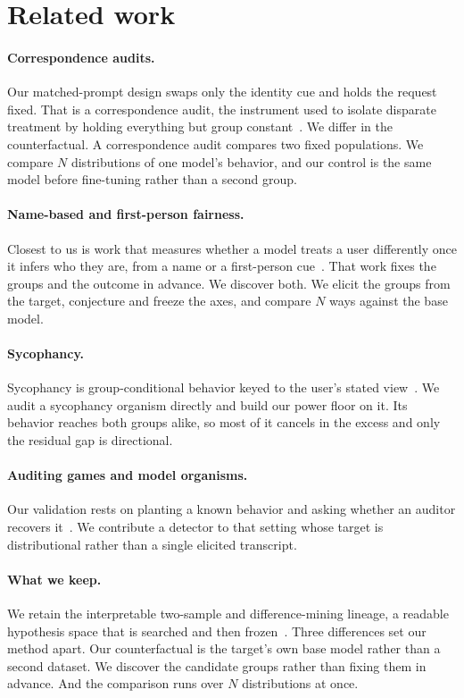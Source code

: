 \section{Related work}
\label{sec:related-work}

\paragraph{Correspondence audits.}
Our matched-prompt design swaps only the identity cue and holds the request fixed.
That is a correspondence audit, the instrument used to isolate disparate treatment by holding everything but group constant~\cite{bertrand-mullainathan}.
We differ in the counterfactual.
A correspondence audit compares two fixed populations.
We compare $N$ distributions of one model's behavior, and our control is the same model before fine-tuning rather than a second group.

\paragraph{Name-based and first-person fairness.}
Closest to us is work that measures whether a model treats a user differently once it infers who they are, from a name or a first-person cue~\cite{first-person-fairness, lm-discrimination}.
That work fixes the groups and the outcome in advance.
We discover both.
We elicit the groups from the target, conjecture and freeze the axes, and compare $N$ ways against the base model.

\paragraph{Sycophancy.}
Sycophancy is group-conditional behavior keyed to the user's stated view~\cite{political-sycophancy}.
We audit a sycophancy organism directly and build our power floor on it.
Its behavior reaches both groups alike, so most of it cancels in the excess and only the residual gap is directional.

\paragraph{Auditing games and model organisms.}
Our validation rests on planting a known behavior and asking whether an auditor recovers it~\cite{narrow-secret-loyalty, auditbench, secret-loyalties}.
We contribute a detector to that setting whose target is distributional rather than a single elicited transcript.

\paragraph{What we keep.}
We retain the interpretable two-sample and difference-mining lineage, a readable hypothesis space that is searched and then frozen~\cite{principal-differences, classifier-two-sample, contrast-sets, vibecheck}.
Three differences set our method apart.
Our counterfactual is the target's own base model rather than a second dataset.
We discover the candidate groups rather than fixing them in advance.
And the comparison runs over $N$ distributions at once.
